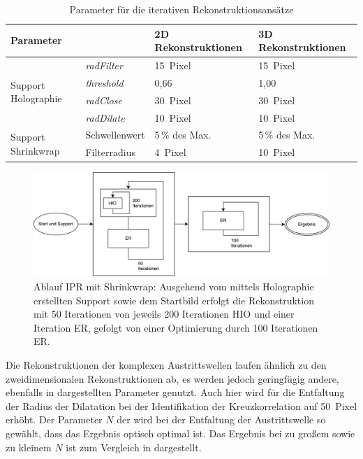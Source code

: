 \begin{table}
	\centering
	\caption{Parameter für die iterativen Rekonstruktionsansätze}
	\label{tab:param}
	\begin{tabular}{llll}
		\hline
		\multicolumn{2}{l}{Parameter} &2D Rekonstruktionen&3D Rekonstruktionen\\ 
		\hline
		\multirow{4}{*}{Support Holographie}&\textit{radFilter} & \SI{15}{Pixel} & \SI{15}{Pixel}\\
											&\textit{threshold} & 0,66           & 1,00\\
											&\textit{radClose}  & \SI{30}{Pixel} & \SI{30}{Pixel}\\
											&\textit{radDilate} & \SI{10}{Pixel} & \SI{10}{Pixel}\\
		\hline
		\multirow{2}{*}{Support Shrinkwrap}			&Schwellenwert      & 5\,\% des Max. & 5\,\% des Max.\\
											&Filterradius       & \SI{4}{Pixel}  & \SI{10}{Pixel}\\                
		\hline
	\end{tabular}
\vspace{1cm}
\end{table}




\begin{figure}
	\centering
	\includegraphics[width=.8\textwidth]{images/flow_holo.pdf}
	\caption[Ablauf IPR mit Holographie]{Ablauf IPR mit Shrinkwrap: Ausgehend vom mittels Holographie erstellten Support sowie dem Startbild erfolgt die Rekonstruktion mit 50 Iterationen von jeweils 200 Iterationen HIO und einer Iteration ER, gefolgt von einer Optimierung durch 100 Iterationen ER.}
	\label{fig:flow_holo}
\end{figure} 

\FloatBarrier

Die Rekonstruktionen der komplexen Austrittswellen laufen ähnlich zu den zweidimensionalen Rekonstruktionen ab, es werden jedoch geringfügig andere, ebenfalls in  dargestellten Parameter genutzt. Auch hier wird für die Entfaltung der Radius der Dilatation bei der Identifikation der Kreuzkorrelation auf \SI{50}{Pixel} erhöht. Der Parameter $N$ der wird bei der Entfaltung der Austrittswelle so gewählt, dass das Ergebnis optisch optimal ist. Das Ergebnis bei zu großem sowie zu kleinem $N$ ist zum Vergleich in  dargestellt.

